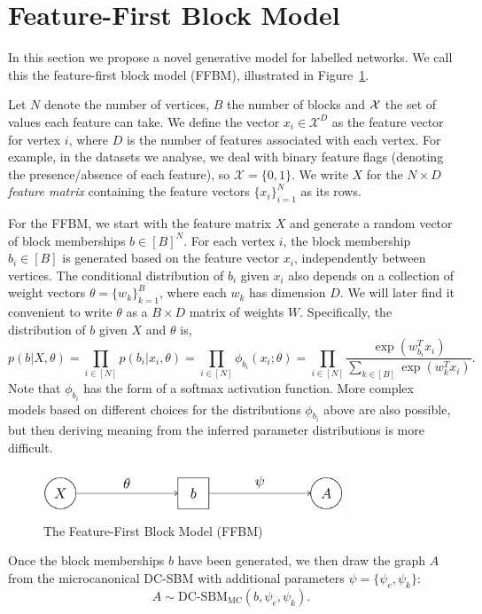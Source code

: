 \section{Feature-First Block Model}

In this section we propose a novel generative model for labelled networks. We call this the feature-first block model (FFBM),
illustrated in Figure~\ref{fig:ffbm}.

Let $N$ denote the number of vertices, $B$ the number of blocks
and ${\cal X}$ the set of values each feature can take.
We define the vector $x_i \in \mathcal{X}^D$ as the feature vector for vertex $i$, 
where $D$ is the number of features associated with each vertex.
For example, in the datasets we analyse, we deal with binary feature flags
(denoting the presence/absence of each feature),
so $\mathcal{X} = \{0, 1\}$. We write $X$ for the $N\times D$ {\em feature matrix} containing
the feature vectors $\{x_i\}_{i=1}^{N}$ 
as its rows.

For the FFBM, we start with the feature matrix $X$ and generate a random
vector of block memberships $b \in [B]^N$. For each vertex $i$, the
block membership $b_i\in[B]$ is generated based on the feature
vector $x_i$, independently between vertices. The conditional
distribution of $b_i$ given $x_i$ also depends on a collection
of weight vectors $\theta=\{w_k\}_{k=1}^B$, where each
$w_k$ has dimension $D$. We will later find it convenient
to write $\theta$ as a $B \times D$ matrix of weights $W$. Specifically, 
the distribution of $b$ given $X$ and $\theta$ is,
%
\begin{equation}
	p(b| X, \theta) = \prod_{i \in [N]} p(b_i | x_i, \theta) = \prod_{i \in [N]} \phi_{b_i} (x_i; \theta)
	= \prod_{i \in [N]} \frac{\exp\left(w_{b_i}^T x_i\right)}{\sum_{k \in [B]} \exp \left( w_k^T x_i\right)}.
\end{equation}
%
Note that $\phi_{b_i}$ has the form of a softmax activation function.
More complex models based on different choices for the distributions
$\phi_{b_i}$ above are also possible, but then deriving meaning from 
the inferred parameter distributions is more difficult. 
%
\begin{figure}[!ht]
	\centering
%		
	\includegraphics[width=0.8\textwidth]{img/ffbm.png}
	\caption{The Feature-First Block Model (FFBM)}
	\label{fig:ffbm}
\end{figure}

Once the block memberships $b$ have been generated, we then draw the 
graph $A$ from the microcanonical DC-SBM with additional parameters 
$\psi = \{\psi_e, \psi_k\}$:
%
\begin{equation}
	A \sim \textrm{DC-SBM}_{\textrm{MC}} (b, \psi_e, \psi_k).
	\label{eqn:A-generation}
\end{equation}
